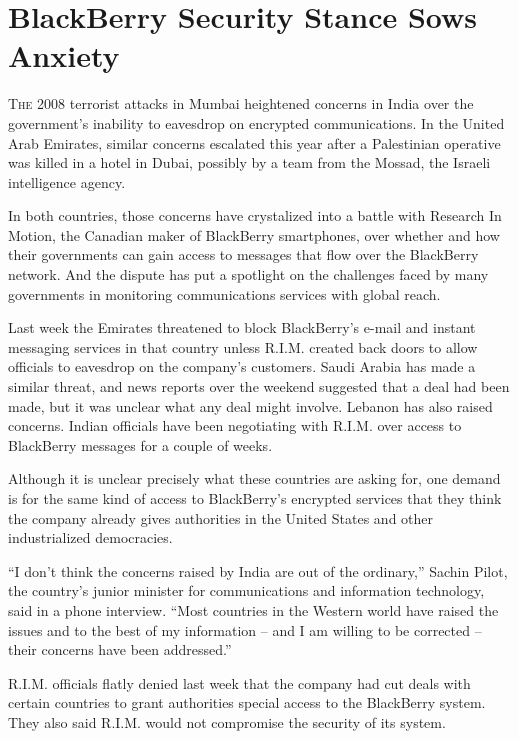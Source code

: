 ﻿\documentclass[12pt]{article}
\begin{document}
\section{BlackBerry Security Stance Sows Anxiety}

\lettrine{T}{he} 2008 terrorist attacks in Mumbai heightened concerns in
India over the government's inability to eavesdrop on encrypted communications. In the United Arab
Emirates, similar concerns escalated this year after a Palestinian operative was killed in a hotel
in Dubai, possibly by a team from the Mossad, the Israeli intelligence agency.

In both countries, those concerns have crystalized into a battle with Research In Motion, the
Canadian maker of BlackBerry smartphones, over whether and how their governments can gain access to
messages that flow over the BlackBerry network. And the dispute has put a spotlight on the
challenges faced by many governments in monitoring communications services with global reach.

Last week the Emirates threatened to block BlackBerry's e-mail and instant messaging services in
that country unless R.I.M. created back doors to allow officials to eavesdrop on the company's
customers. Saudi Arabia has made a similar threat, and news reports over the weekend suggested that
a deal had been made, but it was unclear what any deal might involve. Lebanon has also raised
concerns. Indian officials have been negotiating with R.I.M. over access to BlackBerry messages for
a couple of weeks.

Although it is unclear precisely what these countries are asking for, one demand is for the same
kind of access to BlackBerry's encrypted services that they think the company already gives
authorities in the United States and other industrialized democracies.

``I don't think the concerns raised by India are out of the ordinary,'' Sachin Pilot, the country's
junior minister for communications and information technology, said in a phone interview. ``Most
countries in the Western world have raised the issues and to the best of my information -- and I am
willing to be corrected -- their concerns have been addressed.''

R.I.M. officials flatly denied last week that the company had cut deals with certain countries to
grant authorities special access to the BlackBerry system. They also said R.I.M. would not
compromise the security of its system.
\end{document}
